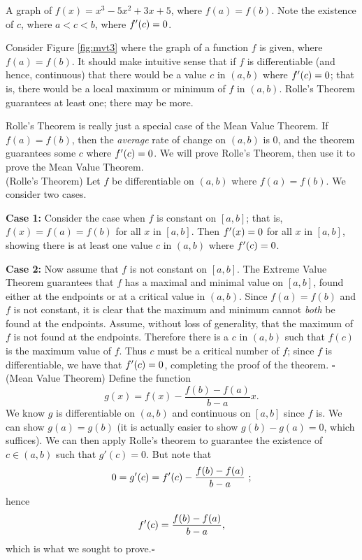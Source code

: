 \begin{marginfigure}[1cm] %
\caption{A graph of $f(x) = x^3-5x^2+3x+5$, where $f(a) = f(b)$. Note the existence of $c$, where $a<c<b$, where $f'(c)=0$.}\label{fig:mvt3}
\end{marginfigure}

Consider Figure \ref{fig:mvt3} where the graph of a function $f$ is given, where $f(a) = f(b)$. It should make intuitive sense that if $f$ is differentiable (and hence, continuous) that there would be a value $c$ in $(a,b)$ where $f'(c)=0$; that is, there would be a local maximum or minimum of $f$ in $(a,b)$. Rolle's Theorem guarantees at least one; there may be more. 

Rolle's Theorem is really just a special case of the Mean Value Theorem. If $f(a) = f(b)$, then the \textit{average} rate of change on $(a,b)$ is $0$, and the theorem guarantees some $c$ where $f'(c)=0$. We will prove Rolle's Theorem, then use it to prove the Mean Value Theorem.\\

\proof (Rolle's Theorem) Let $f$ be differentiable on $(a,b)$ where $f(a)=f(b)$. We consider two cases. 

\noindent\textbf{Case 1:} Consider the case when $f$ is constant on $[a,b]$; that is, $f(x) = f(a) = f(b)$ for all $x$ in $[a,b]$. Then $f'(x) = 0$ for all $x$ in $[a,b]$, showing there is at least one value $c$ in $(a,b)$ where $f'(c)=0$.

\noindent\textbf{Case 2:} Now assume that $f$ is not constant on $[a,b]$. The Extreme Value Theorem guarantees that $f$ has a maximal and minimal value on $[a,b]$, found either at the endpoints or at a critical value in $(a,b)$. Since $f(a)=f(b)$ and $f$ is not constant, it is clear that the maximum and minimum cannot \textit{both} be found at the endpoints. Assume, without loss of generality, that the maximum of $f$ is not found at the endpoints. Therefore there is a $c$ in $(a,b)$ such that $f(c)$ is the maximum value of $f$. Thus $c$ must be a critical number of $f$; since $f$ is differentiable, we have that $f'(c) = 0$, completing the proof of the theorem. \hfill $\square$\\

\proof (Mean Value Theorem) Define the function $$g(x) = f(x) - \frac{f(b)-f(a)}{b-a}x.$$  We know $g$ is differentiable on $(a,b)$ and  continuous on $[a,b]$ since $f$ is. We can show $g(a)=g(b)$ (it is actually easier to show $g(b)-g(a)=0$, which suffices). We can then apply Rolle's theorem to guarantee the existence of $c \in (a,b)$ such that $g'(c) = 0$.  But note that $$0= g'(c) = f'(c) - \frac{f(b)-f(a)}{b-a} \ ;$$ hence $$f'(c) = \frac{f(b)-f(a)}{b-a},$$ which is what we sought to prove.\hfill $\square$\\

